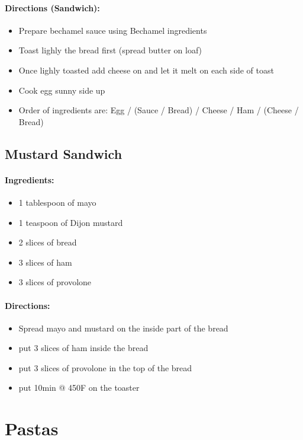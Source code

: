 \documentclass{article}
\begin{document}
\paragraph{Directions (Sandwich):}
\begin{itemize}
    \item Prepare bechamel sauce using Bechamel ingredients
    \item Toast lighly the bread first (spread butter on loaf)
    \item Once lighly toasted add cheese on and let it melt on each side of toast
    \item Cook egg sunny side up
    \item Order of ingredients are: Egg / (Sauce / Bread) / Cheese / Ham / (Cheese / Bread)
\end{itemize} 

\subsection{Mustard Sandwich}

\paragraph{Ingredients:}
\begin{itemize}
    \item 1 tablespoon of mayo
    \item 1 teaspoon of Dijon mustard
    \item 2 slices of bread
    \item 3 slices of ham
    \item 3 slices of provolone
\end{itemize}

\paragraph{Directions:}
\begin{itemize}
    \item Spread mayo and mustard on the inside part of the bread
    \item put 3 slices of ham inside the bread
    \item put 3 slices of provolone in the top of the bread
    \item put 10min @ 450F on the toaster
\end{itemize}

\section{Pastas}
\end{document}
